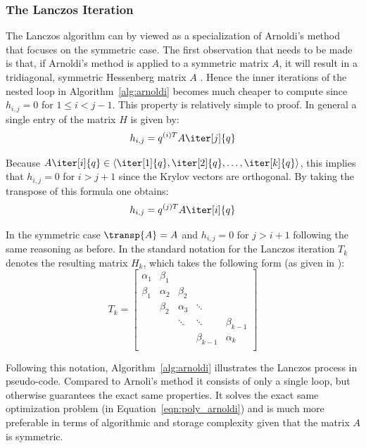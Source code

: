 \subsubsection{The Lanczos Iteration}
\label{sec:lanczos}

The Lanczos algorithm can by viewed as a specialization of Arnoldi's method that focuses on the symmetric case. The first observation that needs to be made is that, if Arnoldi's method is applied to a symmetric matrix $A$, it will result in a tridiagonal, symmetric Hessenberg matrix $A$ \cite{saad_gmres_1986}. Hence the inner iterations of the nested loop in Algorithm~\hyperref[alg:arnoldi]{\ref{alg:arnoldi}} becomes much cheaper to compute since $h_{i,j} = 0$ for $1 \leq i < j-1$. This property is relatively simple to proof. In general a single entry of the matrix $H$ is given by:
\begin{equation}
    h_{i,j}=q^{(i)T} A\iter[j]{q}
\end{equation}

\noindent Because $A\iter[i]{q} \in \langle \iter[1]{q},\iter[2]{q}, \dots , \iter[k]{q}\rangle $, this implies that $h_{i,j} = 0$ for $i>j+1$ since the Krylov vectors are orthogonal. By taking the transpose of this formula one obtains:
\begin{equation}
        h_{i,j}=q^{(j)T} A\iter[i]{q}
\end{equation}

\noindent In the symmetric case $\transp{A} = A$ and $h_{i,j} = 0$ for $j>i+1$ following the same reasoning as before. In the standard notation for the Lanczos iteration $T_k$ denotes the resulting matrix $H_k$, which takes the following form (as given in \cite{trefethen_numerical_1997}):
\begin{equation}
\label{eqn:lanczos}
   T_k = \left[
    \begin{array}{ccccc}
      \alpha_1 & \beta_1 & & & \\
      \beta_1 & \alpha_2 & \beta_2  & & \\
      & \beta_2 & \alpha_3 & \ddots  & \\
       & &\ddots &\ddots &\beta_{k-1} \\
       & & &\beta_{k-1} &\alpha_{k} \\
    \end{array}
  \right] 
\end{equation}

\noindent Following this notation, Algorithm~\hyperref[alg:arnoldi]{\ref{alg:arnoldi}} illustrates the Lanczos process in pseudo-code. Compared to Arnoli's method it consists of only a single loop, but otherwise guarantees the exact same properties. It solves the exact same optimization problem (in Equation~\hyperref[eqn:poly_arnoldi]{\ref{eqn:poly_arnoldi}}) and is much more preferable in terms of algorithmic and storage complexity given that the matrix $A$ is symmetric. 

